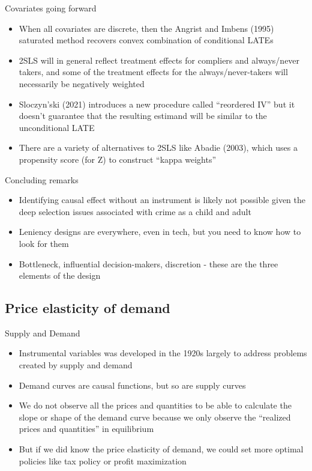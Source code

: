 \documentclass{beamer}
\begin{document}
\begin{frame}{Covariates going forward}

\begin{itemize}
\item When all covariates are discrete, then the Angrist and Imbens (1995) saturated method recovers convex combination of conditional LATEs
\item 2SLS will in general reflect treatment effects for compliers and always/never takers, and some of the treatment effects for the always/never-takers will necessarily be negatively weighted
\item Sloczyn'ski (2021) introduces a new procedure called ``reordered IV'' but it doesn't guarantee that the resulting estimand will be similar to the unconditional LATE
\item There are a variety of alternatives to 2SLS like Abadie (2003), which uses a propensity score (for Z) to construct ``kappa weights'' 
\end{itemize}

\end{frame}

	




\begin{frame}{Concluding remarks}

	\begin{itemize}
	\item Identifying causal effect without an instrument is likely not possible given the deep selection issues associated with crime as a child and adult
	\item Leniency designs are everywhere, even in tech, but you need to know how to look for them
	\item Bottleneck, influential decision-makers, discretion - these are the three elements of the design
	\end{itemize}

\end{frame}


\subsection{Price elasticity of demand}

\begin{frame}{Supply and Demand}

\begin{itemize}
\item Instrumental variables was developed in the 1920s largely to address problems created by supply and demand
\item Demand curves are causal functions, but so are supply curves
\item We do not observe all the prices and quantities to be able to calculate the slope or shape of the demand curve because we only observe the ``realized prices and quantities'' in equilibrium
\item But if we did know the price elasticity of demand, we could set more optimal policies like tax policy or profit maximization
\end{itemize}

\end{frame}
\end{document}
